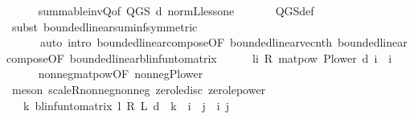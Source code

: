 \begin{isabellebody}
\ \ \ \ \isamarkupfalse%
\ summable{\isacharunderscore}{\kern0pt}inv{\isacharunderscore}{\kern0pt}Q{\isacharbrackleft}{\kern0pt}of\ {\isachardoublequoteopen}Q{\isacharunderscore}{\kern0pt}GS\ d{\isachardoublequoteclose}{\isacharbrackright}{\kern0pt}\ norm{\isacharunderscore}{\kern0pt}{\isasymP}\isactrlsub L{\isacharunderscore}{\kern0pt}less{\isacharunderscore}{\kern0pt}one\ \isanewline
\ \ \ \ \isamarkupfalse%
\ Q{\isacharunderscore}{\kern0pt}GS{\isacharunderscore}{\kern0pt}def\isanewline
\ \ \ \ \isamarkupfalse%
\ {\isacharparenleft}{\kern0pt}subst\ bounded{\isacharunderscore}{\kern0pt}linear{\isachardot}{\kern0pt}suminf{\isacharbrackleft}{\kern0pt}symmetric{\isacharbrackright}{\kern0pt}{\isacharparenright}{\kern0pt}\ \isanewline
\ \ \ \ \ \ {\isacharparenleft}{\kern0pt}auto\ intro{\isacharbang}{\kern0pt}{\isacharcolon}{\kern0pt}\ bounded{\isacharunderscore}{\kern0pt}linear{\isacharunderscore}{\kern0pt}compose{\isacharbrackleft}{\kern0pt}OF\ bounded{\isacharunderscore}{\kern0pt}linear{\isacharunderscore}{\kern0pt}vec{\isacharunderscore}{\kern0pt}nth{\isacharbrackright}{\kern0pt}\ bounded{\isacharunderscore}{\kern0pt}linear{\isacharunderscore}{\kern0pt}compose{\isacharbrackleft}{\kern0pt}OF\ bounded{\isacharunderscore}{\kern0pt}linear{\isacharunderscore}{\kern0pt}blinfun{\isacharunderscore}{\kern0pt}to{\isacharunderscore}{\kern0pt}matrix{\isacharbrackright}{\kern0pt}{\isacharparenright}{\kern0pt}\isanewline
\ \ \isamarkupfalse%
\ {\isachardoublequoteopen}{}\ {\isasymle}\ l{\isacharcircum}{\kern0pt}i\ {\isacharasterisk}{\kern0pt}\isactrlsub R\ matpow\ {\isacharparenleft}{\kern0pt}P{\isacharunderscore}{\kern0pt}lower\ d{\isacharparenright}{\kern0pt}\ i{\isachardoublequoteclose}\ \ i\isanewline
\ \ \ \ \isamarkupfalse%
\ nonneg{\isacharunderscore}{\kern0pt}matpow{\isacharbrackleft}{\kern0pt}OF\ nonneg{\isacharunderscore}{\kern0pt}P{\isacharunderscore}{\kern0pt}lower{\isacharbrackright}{\kern0pt}\ \isanewline
\ \ \ \ \isamarkupfalse%
\ {\isacharparenleft}{\kern0pt}meson\ scaleR{\isacharunderscore}{\kern0pt}nonneg{\isacharunderscore}{\kern0pt}nonneg\ zero{\isacharunderscore}{\kern0pt}le{\isacharunderscore}{\kern0pt}disc\ zero{\isacharunderscore}{\kern0pt}le{\isacharunderscore}{\kern0pt}power{\isacharparenright}{\kern0pt}\isanewline
\ \ \isamarkupfalse%
\ {\isachardoublequoteopen}{}\ {\isasymle}\ {\isacharparenleft}{\kern0pt}{\isasymSum}k{\isachardot}{\kern0pt}\ blinfun{\isacharunderscore}{\kern0pt}to{\isacharunderscore}{\kern0pt}matrix\ {\isacharparenleft}{\kern0pt}{\isacharparenleft}{\kern0pt}l\ {\isacharasterisk}{\kern0pt}\isactrlsub R\ {\isasymP}\isactrlsub L\ d{\isacharparenright}{\kern0pt}\ {\isacharcircum}{\kern0pt}{\isacharcircum}{\kern0pt}\ k{\isacharparenright}{\kern0pt}\ {\isachardollar}{\kern0pt}\ i\ {\isachardollar}{\kern0pt}\ j{\isacharparenright}{\kern0pt}{\isachardoublequoteclose}\ \ i\ j\isanewline

\end{isabellebody}
